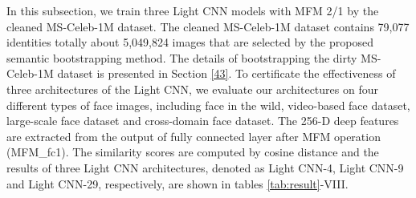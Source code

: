 \documentclass[journal,transmag]{IEEEtran}
\begin{document}



In this subsection, we train three Light CNN models with MFM 2/1 by the cleaned MS-Celeb-1M dataset. The cleaned MS-Celeb-1M dataset contains 79,077 identities totally about 5,049,824 images that are selected by the proposed semantic bootstrapping method. The details of bootstrapping the dirty MS-Celeb-1M dataset is presented in Section \ref{43}. To certificate the effectiveness of three architectures of the Light CNN, we evaluate our architectures on four different types of face images, including face in the wild, video-based face dataset, large-scale face dataset and cross-domain face dataset. The 256-D deep features are extracted from the output of fully connected layer after MFM operation (MFM\_fc1). The similarity scores are computed by cosine distance and the results of three Light CNN architectures, denoted as Light CNN-4, Light CNN-9 and Light CNN-29, respectively, are shown in tables \ref{tab:result}-VIII.
\end{document}
